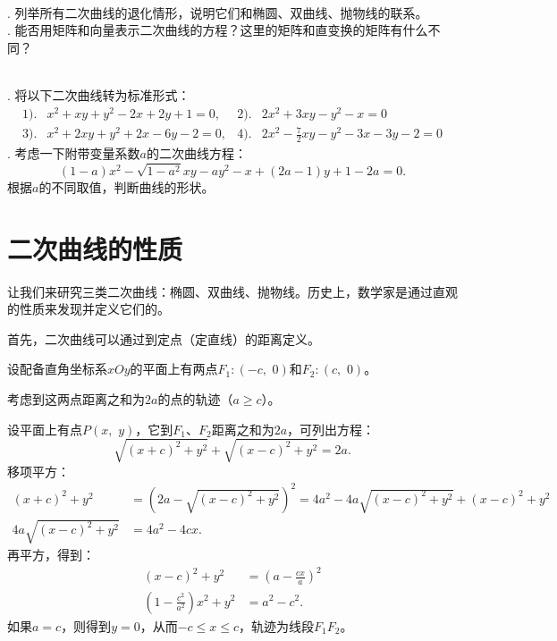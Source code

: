 \documentclass[12pt,UTF8,fontset=none]{ctexbook}
\begin{document}
\begin{sk}
    \mbox{} \\
    . 列举所有二次曲线的退化情形，说明它们和椭圆、双曲线、抛物线的联系。\\
    . 能否用矩阵和向量表示二次曲线的方程？这里的矩阵和直变换的矩阵有什么不同？
\end{sk}

\begin{xt}
    \mbox{} \\
    . 将以下二次曲线转为标准形式：
    \begin{align*}
        1).& x^2 + xy +y^2 - 2x + 2y + 1 = 0,  &2).& 2x^2 + 3xy -y^2 - x = 0 \\
        3).& x^2 + 2xy + y^2 + 2x - 6y - 2 = 0,  & 4).& 2x^2 - \frac{7}{2}xy - y^2 - 3x - 3y - 2 = 0 
    \end{align*}
    . 考虑一下附带变量系数$a$的二次曲线方程：
    $$ (1 - a)x^2 - \sqrt{1 - a^2}xy - ay^2 - x + (2a - 1)y + 1 - 2a = 0. $$
    根据$a$的不同取值，判断曲线的形状。
\end{xt}

\section{二次曲线的性质}

让我们来研究三类二次曲线：椭圆、双曲线、抛物线。历史上，数学家是通过直观的性质来发现并定义它们的。

首先，二次曲线可以通过到定点（定直线）的距离定义。

设配备直角坐标系$xOy$的平面上有两点$F_1:(-c,\,\,0)$和$F_2:(c,\,\,0)$。

考虑到这两点距离之和为$2a$的点的轨迹（$a\geqslant c$）。

设平面上有点$P(x, \,\,y)$，它到$F_1$、$F_2$距离之和为$2a$，可列出方程：
$$ \sqrt{(x + c)^2 + y^2} + \sqrt{(x - c)^2 + y^2} = 2a.$$
移项平方：
\begin{align*}
    (x + c)^2 + y^2 &= (2a - \sqrt{(x - c)^2 + y^2})^2 = 4a^2 - 4a\sqrt{(x - c)^2 + y^2} + (x - c)^2 + y^2 \\
    4a\sqrt{(x - c)^2 + y^2} &= 4a^2 - 4cx.
\end{align*}
再平方，得到：
\begin{align*}
    (x - c)^2 + y^2 &= \left(a - \frac{cx}{a}\right)^2 \\
    (1 - \frac{c^2}{a^2})x^2 + y^2 &= a^2 - c^2.
\end{align*}
如果$a = c$，则得到$y = 0$，从而$-c \leqslant x \leqslant c$，轨迹为线段$F_1F_2$。
\end{document}
